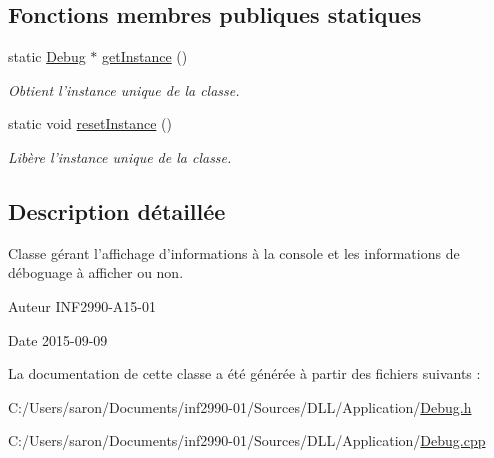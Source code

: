 \subsection*{Fonctions membres publiques statiques}
\begin{DoxyCompactItemize}
\item 
static \hyperlink{class_debug}{Debug} $\ast$ \hyperlink{group__inf2990_ga823bf701dd9f4c706143dca1e8666941}{get\-Instance} ()
\begin{DoxyCompactList}\small\item\em Obtient l'instance unique de la classe. \end{DoxyCompactList}\item 
static void \hyperlink{group__inf2990_gacaafb83305279aafab24735adc903931}{reset\-Instance} ()
\begin{DoxyCompactList}\small\item\em Libère l'instance unique de la classe. \end{DoxyCompactList}\end{DoxyCompactItemize}


\subsection{Description détaillée}
Classe gérant l'affichage d'informations à la console et les informations de déboguage à afficher ou non. 

\begin{DoxyAuthor}{Auteur}
I\-N\-F2990-\/\-A15-\/01 
\end{DoxyAuthor}
\begin{DoxyDate}{Date}
2015-\/09-\/09 
\end{DoxyDate}


La documentation de cette classe a été générée à partir des fichiers suivants \-:\begin{DoxyCompactItemize}
\item 
C\-:/\-Users/saron/\-Documents/inf2990-\/01/\-Sources/\-D\-L\-L/\-Application/\hyperlink{_debug_8h}{Debug.\-h}\item 
C\-:/\-Users/saron/\-Documents/inf2990-\/01/\-Sources/\-D\-L\-L/\-Application/\hyperlink{_debug_8cpp}{Debug.\-cpp}\end{DoxyCompactItemize}
